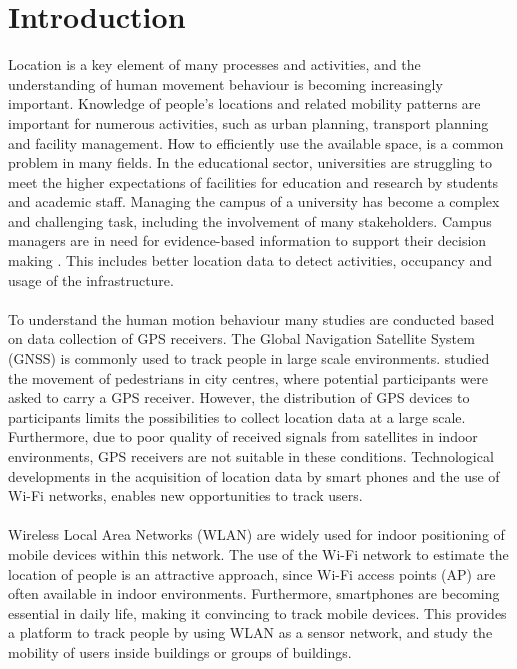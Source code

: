 \section{Introduction}\label{1-introduction}
Location is a key element of many processes and activities, and the understanding of human movement behaviour is becoming increasingly important. Knowledge of people’s locations and related mobility patterns are important for numerous activities, such as urban planning, transport planning and facility management. How to efficiently use the available space, is a common problem in many fields. In the educational sector, universities are struggling to meet the higher expectations of facilities for education and research by students and academic staff. Managing the campus of a university has become a complex and challenging task, including the involvement of many stakeholders. Campus managers are in need for evidence-based information to support their decision making \cite{heijer2012campus}.  This includes better location data to detect activities, occupancy and usage of the infrastructure.
\\\\
To understand the human motion behaviour many studies are conducted based on data collection of GPS receivers. The Global Navigation Satellite System (GNSS) is commonly used to track people in large scale environments. \cite{spek2008tracking} studied the movement of pedestrians in city centres, where potential participants were asked to carry a GPS receiver. However, the distribution of GPS devices to participants limits the possibilities to collect location data at a large scale. Furthermore, due to poor quality of received signals from satellites in indoor environments, GPS receivers are not suitable in these conditions. Technological developments in the acquisition of location data by smart phones and the use of Wi-Fi networks, enables new opportunities to track users. 
\\\\
Wireless Local Area Networks (WLAN) are widely used for indoor positioning of mobile devices within this network. The use of the Wi-Fi network to estimate the location of people is an attractive approach, since Wi-Fi access points (AP) are often available in indoor environments. Furthermore, smartphones are becoming essential in daily life, making it convincing to track mobile devices. This provides a platform to track people by using WLAN as a sensor network, and study the mobility of users inside buildings or groups of buildings. 
